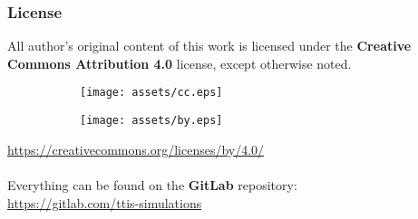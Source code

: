 \begin{frame}
\frametitle{License}
\begin{center}
    All author's original content of this work is licensed under the \textbf{Creative Commons Attribution 4.0} license, except otherwise noted.
\end{center}
\begin{figure}
    \centering
    \begin{subfigure}[b]{0.25\textwidth}
        \centering
        \texttt{[image: assets/cc.eps]}
    \end{subfigure}
    \begin{subfigure}[b]{0.25\textwidth}
        \centering
        \texttt{[image: assets/by.eps]}
    \end{subfigure}
\end{figure}
\begin{center}
    \href{https://creativecommons.org/licenses/by/4.0/}{https://creativecommons.org/licenses/by/4.0/}
    \\~\\
    Everything can be found on the \textbf{GitLab} repository:\\
    \href{https://gitlab.com/ttis-simulations}{https://gitlab.com/ttis-simulations}
\end{center}
\end{frame}
